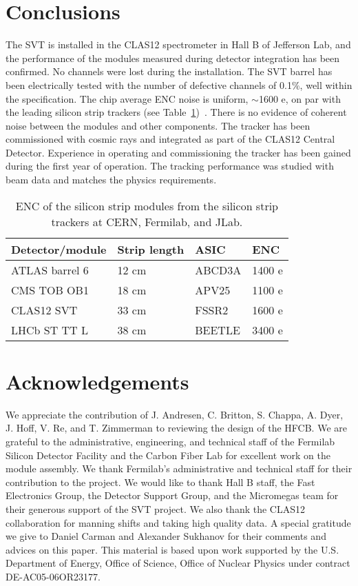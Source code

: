 \section{Conclusions}

The SVT is installed in the CLAS12 spectrometer in Hall B of Jefferson Lab, and the performance of the modules measured during detector integration has been confirmed. No channels were lost during the installation. The SVT barrel has been electrically  tested with the number of defective channels of 0.1$\%$, well within the specification. The chip average ENC noise is uniform, $\sim$1600 e, on par with the leading silicon strip trackers (see Table~\ref{tab:enc-table})~\cite{CMSCOSMICNOTE, ATLASSCT, LHCBTT}. There is no evidence of coherent noise between the modules and other components. The tracker has been commissioned with cosmic rays and integrated as part of the CLAS12 Central Detector. Experience in operating and commissioning the tracker has been gained during the first year of operation. The tracking performance was studied with beam data and matches the physics requirements. 

\begin{table}[hbt]
\begin{tabular}{llll}
\hline
Detector/module      & Strip length & ASIC & ENC\\ \hline
ATLAS barrel 6        & 12 cm & ABCD3A    & 1400 e\\
CMS TOB OB1        & 18 cm & APV25       & 1100 e\\
CLAS12 SVT           & 33 cm & FSSR2       & 1600 e\\
LHCb ST TT L         & 38 cm & BEETLE     & 3400 e\\ \hline
\end{tabular}
\caption{ENC of the silicon strip modules from the silicon strip trackers at CERN, Fermilab, and JLab.}
\label{tab:enc-table}
\end{table}

\section{Acknowledgements}

We appreciate the contribution of J.  Andresen, C. Britton, S. Chappa, A. Dyer, J. Hoff, V. Re, and T. Zimmerman to reviewing the design of the HFCB. We are grateful to the administrative, engineering, and technical staff of the Fermilab Silicon Detector Facility and the Carbon Fiber Lab for excellent work on the module assembly. We thank Fermilab's administrative and technical staff for their contribution to the project. We would like to thank Hall B staff, the Fast Electronics Group, the Detector Support Group, and the Micromegas team for their generous support of the SVT project. We  also  thank the CLAS12 collaboration for manning shifts and taking high quality data. A special gratitude we give to Daniel Carman and Alexander Sukhanov for their comments and advices on this paper. This material is based upon work supported by the U.S. Department of Energy, Office of Science, Office of Nuclear Physics under contract DE-AC05-06OR23177.


